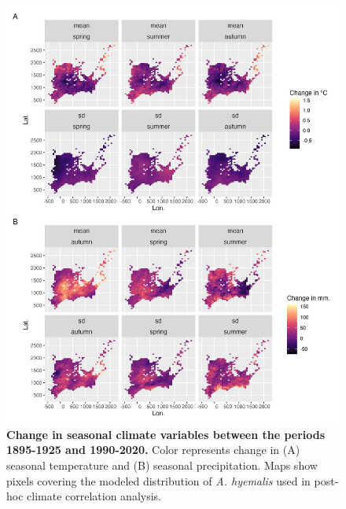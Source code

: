 \documentclass[11pt]{article}
\begin{document}
	\begin{figure}[H]
	\centering
	\includegraphics[width = .8\linewidth]{../Plots/AGHY_climate_change_plot.png}
	\caption{\textbf{Change in seasonal climate variables between the periods 1895-1925 and 1990-2020.} Color represents change in (A) seasonal temperature and (B) seasonal precipitation. Maps show pixels covering the modeled distribution of \emph{A. hyemalis} used in post-hoc climate correlation analysis.}
	\label{fig:AGHY_climate_covariates}
\end{figure}
\end{document}
